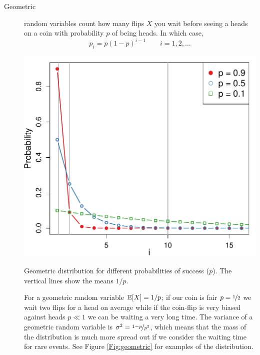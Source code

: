 \begin{description}
\item[Geometric] random variables count how many flips $X$ you wait before seeing a heads on a coin with probability $p$ of being heads. In which case, 
\begin{equation}
p_i =p (1-p)^{i-1} \qquad i=1,2,\dots
\end{equation}
    \begin{marginfigure}
 \begin{center}
   \includegraphics[width=\textwidth]{math_background/dist_pics/Geometric.pdf}\end{center}
 \caption{Geometric distribution for different probabilities of
   success ($p$). The vertical lines show the means $1/p$. }\label{Fig:geometric}
 \end{marginfigure}
For a geometric random variable $\mathbb{E}[X]=1/p$; if our coin is fair
$p=\nicefrac{1}{2}$ we wait two flips for a head on average while if
the coin-flip is very biased against heads $p \ll 1$ we can be waiting
a very long time. The variance of a
geometric random variable is $\sigma^2 =\nicefrac{1-p}{p^2}$, which
means that the mass of the distribution is much more spread out if we
consider the waiting time for rare events. See Figure
\ref{Fig:geometric} for examples of the distribution. 


\end{description}
